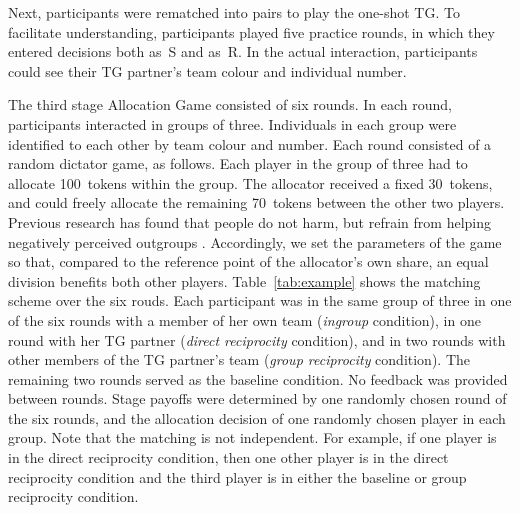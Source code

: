 \documentclass[12pt,a4paper]{article}\usepackage[]{graphicx}\usepackage[]{color}
\begin{document}
Next, participants were rematched into pairs to play the one-shot
TG. To facilitate understanding, participants played five practice
rounds, in which they entered decisions both as~S and as~R. In the
actual interaction, participants could see their TG partner's team
colour and individual number. 

The third stage Allocation Game consisted of six rounds. In each round, participants interacted
in groups of three. Individuals in each group were identified to each other by
team colour and number. Each round consisted of a random dictator game, as
follows. Each player in the group of three had to allocate 100~tokens within the
group. The allocator received a fixed 30~tokens, and could freely allocate the
remaining 70~tokens between the other two players. Previous research has found that
people do not harm, but refrain from helping negatively perceived outgroups
\citep{weisel2015ingroup}. Accordingly, we set the parameters of the game so
that, compared to the reference point of the allocator's own share, an equal
division benefits both other players. Table~\ref{tab:example} shows the matching scheme over the six rouds. Each participant was in the same group of three in one of the six rounds with a
member of her own team (\emph{ingroup} condition), in one round with her TG partner
(\emph{direct reciprocity} condition), and in two rounds with other members of the TG
partner's team (\emph{group reciprocity} condition). The remaining two rounds
served as the baseline condition. No feedback was provided between rounds. Stage payoffs were determined by one randomly chosen round of the six rounds, and
the allocation decision of one randomly chosen player in each group. Note that the matching is not independent. For example, if one player is in the direct reciprocity condition, then one other player
is in the direct reciprocity condition and the third player is in either the baseline or group
reciprocity condition. 
\end{document}
